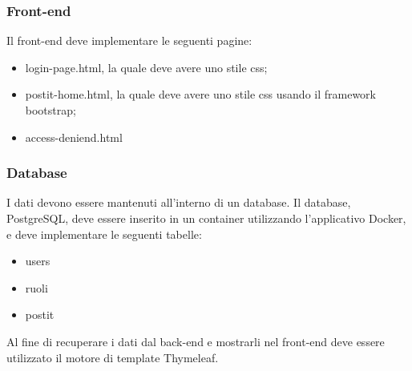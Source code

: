 \subsubsection{Front-end}
Il front-end deve implementare le seguenti pagine:
\begin{itemize}
    \item login-page.html, la quale deve avere uno stile css;
    \item postit-home.html, la quale deve avere uno stile css usando il framework bootstrap;
    \item access-deniend.html
\end{itemize}
\subsubsection{Database}
I dati devono essere mantenuti all'interno di un database.
Il database, PostgreSQL, deve essere inserito in un container utilizzando l'applicativo Docker, e deve implementare le seguenti tabelle:
\begin{itemize}
    \item users
    \item ruoli
    \item postit
\end{itemize}
Al fine di recuperare i dati dal back-end e mostrarli nel front-end deve essere utilizzato il motore di template Thymeleaf.
